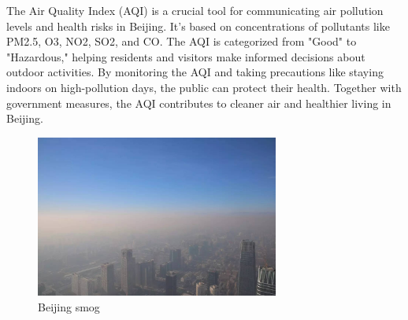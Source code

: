 \documentclass[UTF8]{mcmthesis}
\begin{document}
            The Air Quality Index (AQI) is a crucial tool for communicating air pollution levels and health risks in Beijing. It's based on concentrations of pollutants like PM2.5, O3, NO2, SO2, and CO. The AQI is categorized from "Good" to "Hazardous," helping residents and visitors make informed decisions about outdoor activities. By monitoring the AQI and taking precautions like staying indoors on high-pollution days, the public can protect their health. Together with government measures, the AQI contributes to cleaner air and healthier living in Beijing.

            \begin{figure}[htbp]
                \centering
                \includegraphics[width=8cm]{smog.png}
                \caption{Beijing smog}
            \end{figure}
\end{document}
